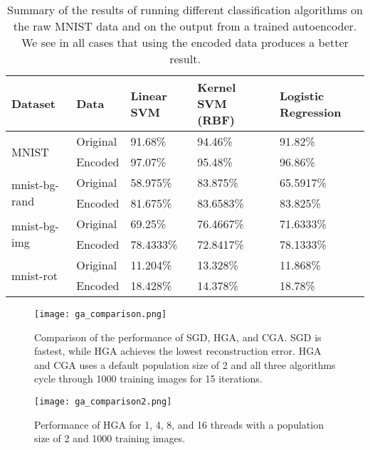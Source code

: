 \begin{table}[h]
	\centering
\begin{tabular}{ll|lll}
    Dataset                        & Data               & Linear SVM & Kernel SVM (RBF) & Logistic Regression \\ \hline
    \multirow{2}{*}{MNIST}         & Original           & 91.68\%    & 94.46\%          & 91.82\%             \\
                                   & Encoded            & 97.07\%    & 95.48\%          & 96.86\%             \\ \hline
    \multirow{2}{*}{mnist-bg-rand} & Original           & 58.975\%   & 83.875\%         & 65.5917\%           \\
                                   & Encoded            & 81.675\%   & 83.6583\%        & 83.825\%            \\ \hline
    \multirow{2}{*}{mnist-bg-img}  & Original           & 69.25\%    & 76.4667\%        & 71.6333\%           \\
                                   & Encoded            & 78.4333\%  & 72.8417\%        & 78.1333\%           \\ \hline
    \multirow{2}{*}{mnist-rot}     & Original           & 11.204\%   & 13.328\%         & 11.868\%           \\
                                   & Encoded            & 18.428\%   & 14.378\%         & 18.78\%
\end{tabular}
	\caption{Summary of the results of running different classification algorithms on the raw MNIST data and on the output from a trained autoencoder. We
	see in all cases that using the encoded data produces a better result.}
	\label{tab:classvsenc}
\end{table}

\begin{figure}[h] \centering
	\texttt{[image: ga\_comparison.png]}
	\caption{Comparison of the performance of SGD, HGA, and CGA. SGD is fastest, while HGA achieves the lowest reconstruction error. HGA and CGA uses a default population size of 2 and all three algorithms cycle through 1000 training images for 15 iterations.}
	\label{fig:ga_comparison}
\end{figure}

\begin{figure}[h] \centering
	\texttt{[image: ga\_comparison2.png]}
	\caption{Performance of HGA for 1, 4, 8, and 16 threads with a population size of 2 and 1000 training images.}
	\label{fig:ga_comparison2}
\end{figure}

